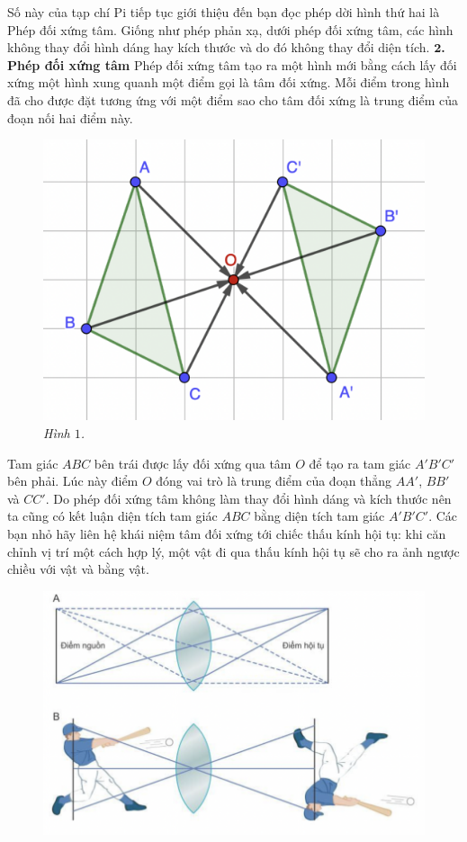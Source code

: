 \begin{multicols}{2}
	Số này của tạp chí Pi tiếp tục giới thiệu đến bạn đọc phép dời hình thứ hai là Phép đối xứng tâm. Giống như phép phản xạ, dưới phép đối xứng tâm, các hình không thay đổi hình dáng hay kích thước và do đó không thay đổi diện tích. 
	\vskip 0.1cm
	\textbf{\color{toancuabi}$\pmb2$. Phép đối xứng tâm}
	\vskip 0.1cm
	Phép đối xứng tâm tạo ra một hình mới bằng cách lấy đối xứng một hình xung quanh một điểm gọi là tâm đối xứng. Mỗi điểm trong hình đã cho được đặt tương ứng với một điểm sao cho tâm đối xứng là trung điểm của đoạn nối hai điểm này.
	\begin{figure}[H]
		\vspace*{-5pt}
		\centering
		\captionsetup{labelformat= empty, justification=centering}
		\includegraphics[width= 0.65\linewidth]{1}
		\caption{\small\textit{\color{toancuabi}Hình $1$.}}
		\vspace*{-10pt}
	\end{figure}
	Tam giác $ABC$ bên trái được lấy đối xứng qua tâm $O$ để tạo ra tam giác $A'B'C'$ bên phải. Lúc này điểm $O$ đóng vai trò là trung điểm của đoạn thẳng $AA'$, $BB'$ và $CC'$. Do phép đối xứng tâm không làm thay đổi hình dáng và kích thước nên ta cũng có kết luận diện tích tam giác $ABC$ bằng diện tích tam giác $A'B'C'$. Các bạn nhỏ hãy liên hệ khái niệm tâm đối xứng tới chiếc thấu kính hội tụ: khi căn chỉnh vị trí một cách hợp lý, một vật đi qua thấu kính hội tụ sẽ cho ra ảnh ngược chiều với vật và bằng vật.
	\begin{figure}[H]
		\vspace*{-5pt}
		\centering
		\captionsetup{labelformat= empty, justification=centering}
		\includegraphics[width= 0.85\linewidth]{2}

\end{figure}
\end{multicols}
